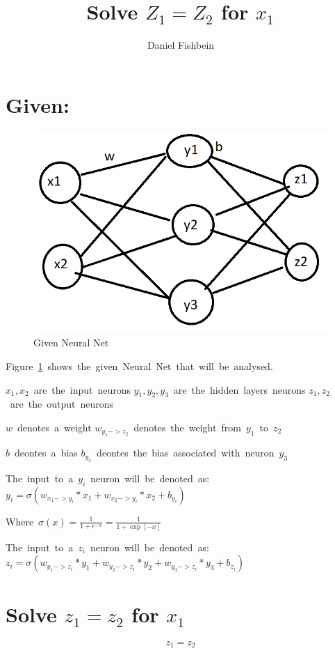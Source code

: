 \documentclass{article}
\title{Solve $Z_1 = Z_2$ for $x_1$}
\author{Daniel Fishbein}
\begin{document}
\maketitle

\section{Given:}

\begin{figure}[h!]{
    \centering
    \includegraphics[width=0.5\linewidth]{Given_NN.png}
    \caption{Given Neural Net}\label{fig:NeuralNet}
    }
\end{figure}

\hbox{Figure~\ref{fig:NeuralNet} shows the given Neural Net that will be analysed.}

\vspace{5mm}
\hbox{$x_1, x_2$ are the input neurons}
\hbox{$y_1, y_2, y_3$ are the hidden layers neurons}
\hbox{$z_1, z_2$ are the output neurons}

\vspace{2mm}
\hbox{$w$ denotes a weight}
\hbox{$w_{y_1->z_2}$ denotes the weight from $y_1$ to $z_2$}

\vspace{2mm}
\hbox{$b$ deontes a bias}
\hbox{$b_{y_3}$ deontes the bias associated with neuron $y_3$}

\vspace{5mm}
\hbox{The input to a $y_i$ neuron will be denoted as:}
\hbox{$y_i = \sigma(w_{x_1->y_i} * x_1 + w_{x_2->y_i} * x_2 + b_{y_i} )$}

\vspace{2mm}
\hbox{Where $\sigma(x) = \frac{1}{1+e^{-x}} = \frac{1}{1+\exp[-x]}$}

\vspace{5mm}
\hbox{The input to a $z_i$ neuron will be denoted as:}
\hbox{$z_i = \sigma(w_{y_1->z_i}*y_1 + w_{y_2->z_i}*y_2 + w_{y_3->z_i}*y_3 + b_{z_i} )$}




\section{Solve $z_1 = z_2$ for $x_1$}
\begin{equation}
    z_1 = z_2    
\end{equation}
\end{document}
